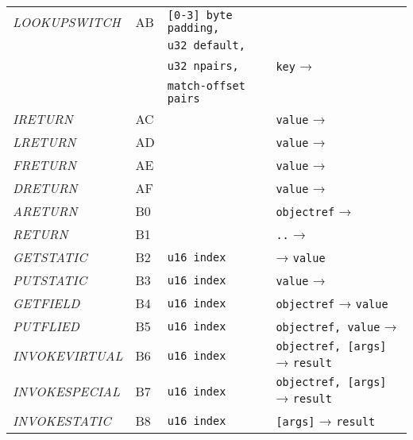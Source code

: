 \begin{center}
\begin{longtable}{ | p{} | p{} | p{} | p{} | }
        \emph{LOOKUPSWITCH}
		& AB & \lstinline|[0-3] byte padding, | & \\
        & & \lstinline|u32 default, | & \\
        & & \lstinline|u32 npairs, | & \lstinline|key| → \\
        & & \lstinline|match-offset pairs| & 
		\\ \hline

        \emph{IRETURN}
		& AC & & \lstinline|value| →
		\\ \hline

        \emph{LRETURN}
		& AD & & \lstinline|value| →
		\\ \hline

        \emph{FRETURN}
		& AE & & \lstinline|value| →
		\\ \hline

        \emph{DRETURN}
		& AF & & \lstinline|value| →
		\\ \hline

        \emph{ARETURN}
		& B0 & & \lstinline|objectref| →
		\\ \hline

        \emph{RETURN}
		& B1 & & \lstinline|..| →
		\\ \hline

        \emph{GETSTATIC}
		& B2 & \lstinline|u16 index| & → \lstinline|value|
		\\ \hline

        \emph{PUTSTATIC}
		& B3 & \lstinline|u16 index| & \lstinline|value| → 
		\\ \hline

        \emph{GETFIELD}
		& B4 & \lstinline|u16 index| & \lstinline|objectref| → \lstinline|value|
		\\ \hline

        \emph{PUTFLIED}
		& B5 & \lstinline|u16 index| & \lstinline|objectref, value| → 
		\\ \hline

        \emph{INVOKEVIRTUAL}
		& B6 & \lstinline|u16 index| & \lstinline|objectref, [args]| → \lstinline|result|
		\\ \hline

        \emph{INVOKESPECIAL}
		& B7 & \lstinline|u16 index| & \lstinline|objectref, [args]| → \lstinline|result|
		\\ \hline

        \emph{INVOKESTATIC}
		& B8 & \lstinline|u16 index| & \lstinline|[args]| → \lstinline|result|
		\\ \hline


\end{longtable}
\end{center}
